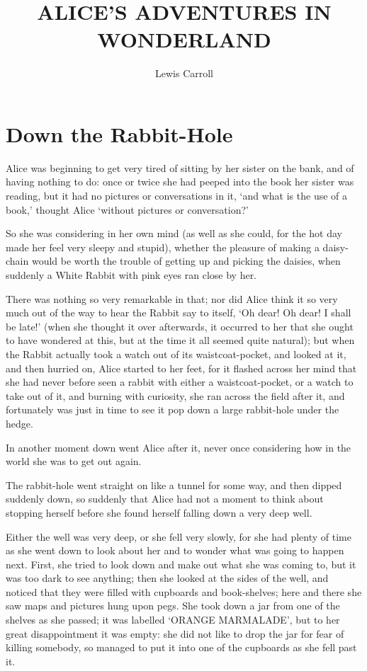 \documentclass[statementpaper,twoside,openany]{memoir}
\author{Lewis Carroll}
\title{ALICE'S ADVENTURES IN WONDERLAND}
\date{}
\begin{document}
\maketitle

\newpage\null\thispagestyle{empty}\newpage

\tableofcontents

\newpage\null\thispagestyle{empty}\newpage

\chapter{Down the Rabbit-Hole}

Alice was beginning to get very tired of sitting by her sister on the bank, and of having nothing to do: once or twice she had peeped into the book her sister was reading, but it had no pictures or conversations in it, `and what is the use of a book,' thought Alice `without pictures or conversation?'

So she was considering in her own mind (as well as she could, for the hot day made her feel very sleepy and stupid), whether the pleasure of making a daisy-chain would be worth the trouble of getting up and picking the daisies, when suddenly a White Rabbit with pink eyes ran close by her.

There was nothing so very remarkable in that; nor did Alice think it so very much out of the way to hear the Rabbit say to itself, `Oh dear! Oh dear! I shall be late!' (when she thought it over afterwards, it occurred to her that she ought to have wondered at this, but at the time it all seemed quite natural); but when the Rabbit actually took a watch out of its waistcoat-pocket, and looked at it, and then hurried on, Alice started to her feet, for it flashed across her mind that she had never before seen a rabbit with either a waistcoat-pocket, or a watch to take out of it, and burning with curiosity, she ran across the field after it, and fortunately was just in time to see it pop down a large rabbit-hole under the hedge.

In another moment down went Alice after it, never once considering how in the world she was to get out again.

The rabbit-hole went straight on like a tunnel for some way, and then dipped suddenly down, so suddenly that Alice had not a moment to think about stopping herself before she found herself falling down a very deep well.

Either the well was very deep, or she fell very slowly, for she had plenty of time as she went down to look about her and to wonder what was going to happen next. First, she tried to look down and make out what she was coming to, but it was too dark to see anything; then she looked at the sides of the well, and noticed that they were filled with cupboards and book-shelves; here and there she saw maps and pictures hung upon pegs. She took down a jar from one of the shelves as she passed; it was labelled `ORANGE MARMALADE', but to her great disappointment it was empty: she did not like to drop the jar for fear of killing somebody, so managed to put it into one of the cupboards as she fell past it.
\end{document}
